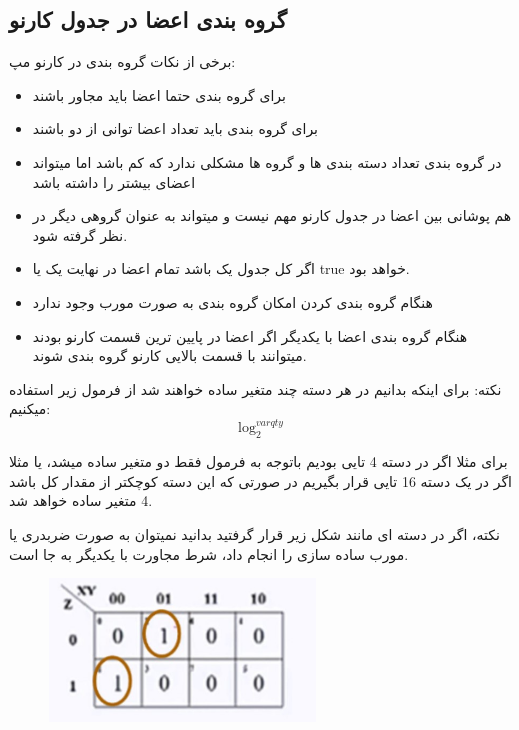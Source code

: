 \documentclass[20pt, a4paper]{article}
\begin{document}
\subsection{گروه بندی اعضا در جدول کارنو}
برخی از نکات گروه بندی در کارنو مپ:

\begin{itemize}
	\item برای گروه بندی حتما اعضا باید مجاور باشند
	\item برای گروه بندی باید تعداد اعضا توانی از دو باشند
	\item در گروه بندی تعداد دسته بندی ها و گروه ها مشکلی ندارد که کم باشد اما میتواند اعضای بیشتر را داشته باشد
	\item هم پوشانی بین اعضا در جدول کارنو مهم نیست و میتواند به عنوان گروهی دیگر در نظر گرفته شود.
	\item اگر کل جدول یک باشد تمام اعضا در نهایت یک یا true خواهد بود.
	\item هنگام گروه بندی کردن امکان گروه بندی به صورت مورب وجود ندارد
	\item هنگام گروه بندی اعضا با یکدیگر اگر اعضا در پایین ترین قسمت کارنو بودند میتوانند 
	با قسمت بالایی کارنو گروه بندی شوند.
\end{itemize}

نکته:
برای اینکه بدانیم در هر دسته چند متغیر ساده خواهند شد از فرمول زیر استفاده میکنیم:
{\Large\begin{equation}
	\log^{var qty}_{2}
\end{equation}}


برای مثلا اگر در دسته 4 تایی بودیم باتوجه به فرمول فقط دو متغیر ساده میشد، یا مثلا
اگر در یک دسته 16 تایی قرار بگیریم در صورتی که این دسته کوچکتر از مقدار کل باشد
4 متغیر ساده خواهد شد.

نکته، اگر در دسته ای مانند شکل زیر قرار گرفتید بدانید نمیتوان به صورت ضربدری یا مورب
ساده سازی را انجام داد، شرط مجاورت با یکدیگر به جا است.

\begin{figure}[htbp]\centering
	\centerline{\includegraphics[width=200pt]{img/karnoughMap/badFormat.jpg}}
\end{figure}
\end{document}
